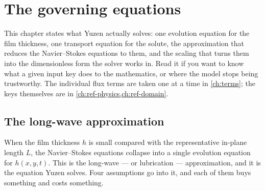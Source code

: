 \chapter{The governing equations}
\label{ch:governing}

This chapter states what Yuzen actually solves: one evolution equation for the
film thickness, one transport equation for the solute, the approximation that
reduces the Navier--Stokes equations to them, and the scaling that turns them
into the dimensionless form the solver works in. Read it if you want to know
what a given input key does to the mathematics, or where the model stops being
trustworthy. The individual flux terms are taken one at a time in
\cref{ch:terms}; the keys themselves are in \cref{ch:ref-physics,ch:ref-domain}.

\section{The long-wave approximation}
\label{sec:governing:longwave}

When the film thickness $h$ is small compared with the representative in-plane
length $L$, the Navier--Stokes equations collapse into a single evolution
equation for $h(x,y,t)$. This is the long-wave --- or lubrication ---
approximation, and it is the equation Yuzen solves. Four assumptions go into
it, and each of them buys something and costs something.


